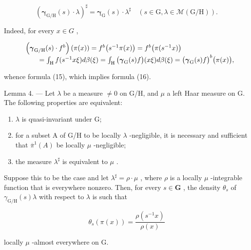 \[
\left(\boldsymbol {\gamma} _ {\mathrm{G/H}} (s) \cdot \lambda\right) ^ {\sharp} = \boldsymbol {\gamma} _ {\mathrm{G}} (s) \cdot \lambda^ {\sharp} \quad \left(s \in \mathrm{G}, \lambda \in \mathscr {M} (\mathrm{G/H})\right).\tag{16}
\]

Indeed, for every \(x \in G\) ,

\[
\begin{array}{r l} & {\left(\boldsymbol {\gamma} _ {\mathrm{G/H}} (s) \cdot f ^ {b}\right) (\pi (x)) = f ^ {b} \big (s ^ {- 1} \pi (x) \big) = f ^ {b} \big (\pi (s ^ {- 1} x) \big)} \\ & {\qquad = \int_ {\mathrm{H}} f (s ^ {- 1} x \xi) d \beta (\xi) = \int_ {\mathrm{H}} \big (\boldsymbol {\gamma} _ {\mathrm{G}} (s) f \big) (x \xi) d \beta (\xi) = \big (\boldsymbol {\gamma} _ {\mathrm{G}} (s) f \big) ^ {b} \big (\pi (x) \big),} \end{array}
\]

whence formula (15), which implies formula (16).

Lemma 4. --- Let \(\lambda\) be a measure \(\neq 0\) on G/H, and \(\mu\) a left Haar measure on G. The following properties are equivalent:

\begin{enumerate}
\def\labelenumi{\alph{enumi})}
\item
  \(\lambda\) is quasi-invariant under G;
\item
  for a subset A of G/H to be locally \(\lambda\) -negligible, it is necessary and sufficient that \(\overline{\pi}^{1}(A)\) be locally \(\mu\) -negligible;
\item
  the measure \(\lambda^{\sharp}\) is equivalent to \(\mu\) .
\end{enumerate}

Suppose this to be the case and let \(\lambda^{\sharp} = \rho \cdot \mu\) , where \(\rho\) is a locally \(\mu\) -integrable function that is everywhere nonzero. Then, for every \(s \in \mathbf{G}\) , the density \(\theta_s\) of \(\gamma_{\mathrm{G / H}}(s)\lambda\) with respect to \(\lambda\) is such that

\[
\theta_ {s} (\pi (x)) = \frac {\rho (s ^ {- 1} x)}{\rho (x)}\tag{17}
\]

locally \(\mu\) -almost everywhere on G.

